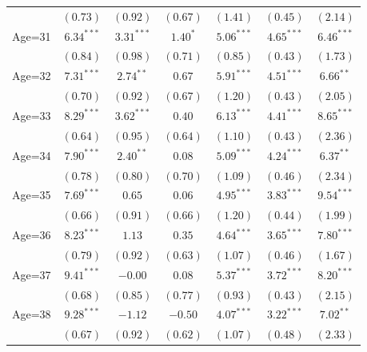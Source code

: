 \documentclass[fullpage]{paper}
\begin{document}
\begin{center}
\begin{longtable}{l c c c c c c }
            & $(0.73)$      & $(0.92)$       & $(0.67)$      & $(1.41)$       & $(0.45)$       & $(2.14)$      \\
Age=31      & $6.34^{***}$  & $3.31^{***}$   & $1.40^{*}$    & $5.06^{***}$   & $4.65^{***}$   & $6.46^{***}$  \\
            & $(0.84)$      & $(0.98)$       & $(0.71)$      & $(0.85)$       & $(0.43)$       & $(1.73)$      \\
Age=32      & $7.31^{***}$  & $2.74^{**}$    & $0.67$        & $5.91^{***}$   & $4.51^{***}$   & $6.66^{**}$   \\
            & $(0.70)$      & $(0.92)$       & $(0.67)$      & $(1.20)$       & $(0.43)$       & $(2.05)$      \\
Age=33      & $8.29^{***}$  & $3.62^{***}$   & $0.40$        & $6.13^{***}$   & $4.41^{***}$   & $8.65^{***}$  \\
            & $(0.64)$      & $(0.95)$       & $(0.64)$      & $(1.10)$       & $(0.43)$       & $(2.36)$      \\
Age=34      & $7.90^{***}$  & $2.40^{**}$    & $0.08$        & $5.09^{***}$   & $4.24^{***}$   & $6.37^{**}$   \\
            & $(0.78)$      & $(0.80)$       & $(0.70)$      & $(1.09)$       & $(0.46)$       & $(2.34)$      \\
Age=35      & $7.69^{***}$  & $0.65$         & $0.06$        & $4.95^{***}$   & $3.83^{***}$   & $9.54^{***}$  \\
            & $(0.66)$      & $(0.91)$       & $(0.66)$      & $(1.20)$       & $(0.44)$       & $(1.99)$      \\
Age=36      & $8.23^{***}$  & $1.13$         & $0.35$        & $4.64^{***}$   & $3.65^{***}$   & $7.80^{***}$  \\
            & $(0.79)$      & $(0.92)$       & $(0.63)$      & $(1.07)$       & $(0.46)$       & $(1.67)$      \\
Age=37      & $9.41^{***}$  & $-0.00$        & $0.08$        & $5.37^{***}$   & $3.72^{***}$   & $8.20^{***}$  \\
            & $(0.68)$      & $(0.85)$       & $(0.77)$      & $(0.93)$       & $(0.43)$       & $(2.15)$      \\
Age=38      & $9.28^{***}$  & $-1.12$        & $-0.50$       & $4.07^{***}$   & $3.22^{***}$   & $7.02^{**}$   \\
            & $(0.67)$      & $(0.92)$       & $(0.62)$      & $(1.07)$       & $(0.48)$       & $(2.33)$      \\

\end{longtable}
\end{center}
\end{document}

